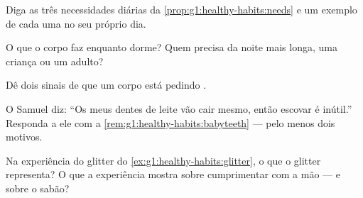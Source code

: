 \begin{exercise}[$\star$]\label{exo:g1:healthy-habits:6}
Diga as três necessidades diárias da \cref{prop:g1:healthy-habits:needs}
e um exemplo de cada uma no seu próprio dia.
\end{exercise}

\begin{exercise}[$\star$]\label{exo:g1:healthy-habits:7}
O que o corpo faz enquanto dorme? Quem precisa da noite mais longa,
uma criança ou um adulto?
\end{exercise}

\begin{exercise}[$\star$]\label{exo:g1:healthy-habits:8}
Dê dois sinais de que um corpo está pedindo .
\end{exercise}

\begin{exercise}[$\star\star$]\label{exo:g1:healthy-habits:9}
O Samuel diz: ``Os meus dentes de leite vão cair mesmo, então
escovar é inútil.'' Responda a ele com a
\cref{rem:g1:healthy-habits:babyteeth} --- pelo menos dois motivos.
\end{exercise}

\begin{exercise}[$\star\star$]\label{exo:g1:healthy-habits:10}
Na experiência do glitter do \cref{ex:g1:healthy-habits:glitter}, o
que o glitter representa? O que a experiência mostra sobre
cumprimentar com a mão --- e sobre o sabão?
\end{exercise}
